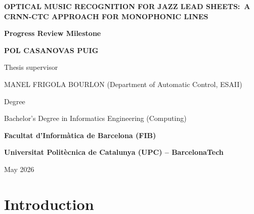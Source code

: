 \documentclass[11pt, a4paper]{article}
\begin{document}

\begin{titlepage}
    \centering

    \vspace*{2cm}

    {\LARGE\bfseries OPTICAL MUSIC RECOGNITION FOR JAZZ LEAD SHEETS:\ A CRNN-CTC APPROACH FOR MONOPHONIC LINES \par}

    \vspace{2cm}

    {\Large\bfseries Progress Review Milestone \par}

    \vspace{2cm}

    {\large\bfseries POL CASANOVAS PUIG \par}

    \vspace{1.5cm}

    {\small Thesis supervisor \par}
    {\small MANEL FRIGOLA BOURLON (Department of Automatic Control, ESAII) \par}

    \vspace{0.5cm}

    {\small Degree \par}
    {\small Bachelor's Degree in Informatics Engineering (Computing) \par}

    \vfill

    {\small\bfseries Facultat d'Inform\`atica de Barcelona (FIB) \par}

    \vspace{0.2cm}

    {\small\bfseries Universitat Polit\`ecnica de Catalunya (UPC) -- BarcelonaTech \par}

    \vspace{0.8cm}
    {\small May 2026 \par}
\end{titlepage}

\tableofcontents
\newpage

\section{Introduction}
\label{sec:intro}
\end{document}
